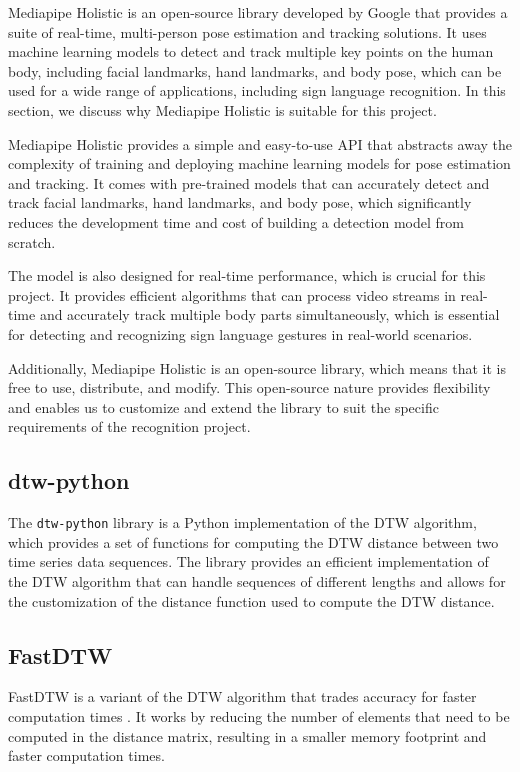 \documentclass[final,rdr32.tex]{subfiles}
\begin{document}
Mediapipe Holistic is an open-source library developed by Google that provides a suite of real-time, multi-person pose estimation and tracking solutions. It uses machine learning models to detect and track multiple key points on the human body, including facial landmarks, hand landmarks, and body pose, which can be used for a wide range of applications, including sign language recognition. In this section, we discuss why Mediapipe Holistic is suitable for this project.

Mediapipe Holistic provides a simple and easy-to-use API that abstracts away the complexity of training and deploying machine learning models for pose estimation and tracking. It comes with pre-trained models that can accurately detect and track facial landmarks, hand landmarks, and body pose, which significantly reduces the development time and cost of building a detection model from scratch.

The model is also designed for real-time performance, which is crucial for this project. It provides efficient algorithms that can process video streams in real-time and accurately track multiple body parts simultaneously, which is essential for detecting and recognizing sign language gestures in real-world scenarios.

Additionally, Mediapipe Holistic is an open-source library, which means that it is free to use, distribute, and modify. This open-source nature provides flexibility and enables us to customize and extend the library to suit the specific requirements of the recognition project.

\subsection{dtw-python}

The \verb|dtw-python| library is a Python implementation of the DTW algorithm, which provides a set of functions for computing the DTW distance between two time series data sequences. The library provides an efficient implementation of the DTW algorithm that can handle sequences of different lengths and allows for the customization of the distance function used to compute the DTW distance.

\subsection{FastDTW}
\label{sec:prepfastdtw}

FastDTW is a variant of the DTW algorithm that trades accuracy for faster computation times \cite{salvador2007toward}. It works by reducing the number of elements that need to be computed in the distance matrix, resulting in a smaller memory footprint and faster computation times.
\end{document}
